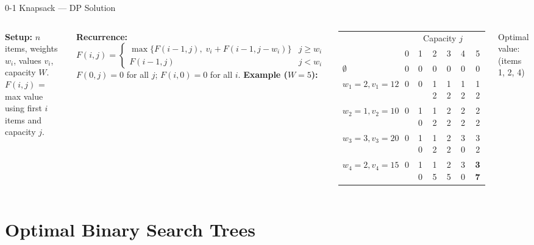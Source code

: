 \documentclass[aspectratio=169]{beamer}
\begin{document}
\begin{frame}[shrink=12]{0-1 Knapsack — DP Solution}
  \begin{columns}[T]
      \textbf{Setup:} $n$ items, weights $w_i$, values $v_i$, capacity $W$.\\
      $F(i,j)$ = max value using first $i$ items and capacity $j$.

      \vspace{0.3em}
      \textbf{Recurrence:}
      \[
        F(i,j) =
        \begin{cases}
          \max\{F(i{-}1,j),\;v_i + F(i{-}1,j{-}w_i)\} & j \geq w_i \\
          F(i{-}1,j) & j < w_i
        \end{cases}
      \]
      $F(0,j) = 0$ for all $j$;\; $F(i,0) = 0$ for all $i$.
      \textbf{Example ($W=5$):}
      \vspace{0.2em}

      \begin{tabular}{l*{6}{c}}
        \toprule
        & \multicolumn{6}{c}{Capacity $j$} \\
        \cmidrule(lr){2-7}
        & 0 & 1 & 2 & 3 & 4 & 5 \\
        \midrule
        $\emptyset$ & 0&0&0&0&0&0 \\
        $w_1{=}2,v_1{=}12$ & 0&0&12&12&12&12\\
        $w_2{=}1,v_2{=}10$ & 0&10&12&22&22&22\\
        $w_3{=}3,v_3{=}20$ & 0&10&12&22&30&32\\
        $w_4{=}2,v_4{=}15$ & 0&10&15&25&30&\textbf{37}\\
        \bottomrule
      \end{tabular}
      \vspace{0.2em}
      Optimal value:  (items 1, 2, 4)
  \end{columns}
\end{frame}

\section{Optimal Binary Search Trees}
\end{document}

